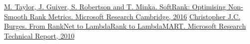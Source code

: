 \documentclass[12pt,a4paper]{amsart}
\theoremstyle{definition}
\theoremstyle{definition}
\begin{document}

\newpage

\begin{thebibliography}{1}

 \href{https://www.microsoft.com/en-us/research/publication/softrank-optimising-non-smooth-rank-metrics/}
{M. Taylor, J. Guiver, S. Robertson and T. Minka. SoftRank: Optimising Non-Smooth Rank Metrics. Microsoft Research Cambridge, 2016}
 \href{https://www.microsoft.com/en-us/research/publication/from-ranknet-to-lambdarank-to-lambdamart-an-overview/}
{Christopher J.C. Burges. From RankNet to LambdaRank to LambdaMART. Microsoft Research Technical Report, 2010}

\end{thebibliography}


\vspace{0.7cm}
\end{document}

